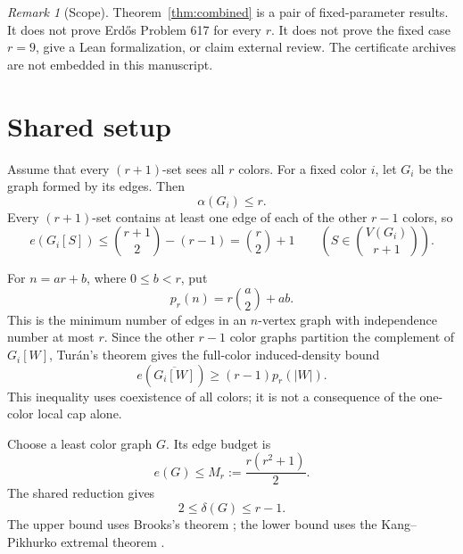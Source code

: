 \documentclass[11pt,reqno,a4paper]{amsart}
\theoremstyle{definition}
\theoremstyle{remark}
\newtheorem{remark}[theorem]{Remark}
\newcommand{\comp}[1]{\overline{#1}}
\begin{document}
\begin{remark}[Scope]\label{rem:scope}
Theorem~\ref{thm:combined} is a pair of fixed-parameter results. It does
not prove Erd\H{o}s Problem 617 for every $r$. It does not prove the fixed
case $r=9$, give a Lean formalization, or claim external review. The
certificate archives are not embedded in this manuscript.
\end{remark}

\section{Shared setup}\label{sec:setup}

Assume that every $(r+1)$-set sees all $r$ colors. For a fixed color $i$,
let $G_i$ be the graph formed by its edges. Then
\begin{equation}\label{eq:alpha}
  \alpha(G_i)\leq r.
\end{equation}
Every $(r+1)$-set contains at least one edge of each of the other $r-1$
colors, so
\begin{equation}\label{eq:local-cap}
  e(G_i[S])\leq\binom{r+1}{2}-(r-1)=\binom r2+1
  \qquad\left(S\in\binom{V(G_i)}{r+1}\right).
\end{equation}

For $n=ar+b$, where $0\leq b<r$, put
\begin{equation}\label{eq:pr}
  p_r(n)=r\binom a2+ab.
\end{equation}
This is the minimum number of edges in an $n$-vertex graph with
independence number at most $r$. Since the other $r-1$ color graphs
partition the complement of $G_i[W]$, Tur\'an's theorem gives the
full-color induced-density bound
\begin{equation}\label{eq:colored-density}
  e\!\left(\comp{G_i[W]}\right)\geq(r-1)p_r(|W|).
\end{equation}
This inequality uses coexistence of all colors; it is not a consequence of
the one-color local cap alone.

Choose a least color graph $G$. Its edge budget is
\begin{equation}\label{eq:least-budget}
  e(G)\leq M_r:=\frac{r(r^2+1)}2.
\end{equation}
The shared reduction gives
\begin{equation}\label{eq:degree-window}
  2\leq\delta(G)\leq r-1.
\end{equation}
The upper bound uses Brooks's theorem \cite{Brooks1941}; the lower bound
uses the Kang--Pikhurko extremal theorem \cite{KangPikhurko2005}.
\end{document}
